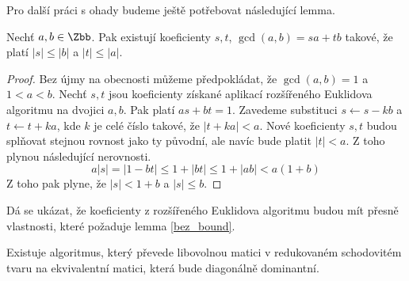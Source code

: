 Pro další práci s ohady budeme ještě potřebovat následující lemma.
\begin{lem} \label{bez_bound}
Nechť $ a, b \in \Zbb $. Pak existují koeficienty
$ s, t $, $ \gcd(a, b) = s a + t b $ takové, že platí $ |s| \leq |b| $ a
$ |t| \leq |a| $.
\end{lem}
\begin{proof}
Bez újmy na obecnosti můžeme předpokládat, že $ \gcd(a, b) = 1 $ a $ 1 < a < b $.
Nechť $ s, t $ jsou koeficienty získané aplikací rozšířeného Euklidova algoritmu
na dvojici $ a, b $. Pak platí $ a s + b t = 1 $. Zavedeme substituci
$ s \leftarrow s - k b $ a $ t \leftarrow t + k a $, kde $ k $ je celé číslo takové, že
$ |t + k a| < a $. Nové koeficienty $ s,t $ budou splňovat stejnou rovnost
jako ty původní, ale navíc bude platit $ |t| < a $. Z toho plynou následující
nerovnosti.
\begin{equation*}
    a |s| = | 1 - bt | \leq 1 + |bt| \leq 1 + |ab| < a(1 + b)
\end{equation*}
Z toho pak plyne, že $ |s| < 1 + b $ a $ |s| \leq b $.
\end{proof}
\begin{pozn}
Dá se ukázat, že koeficienty z rozšířeného Euklidova algoritmu budou mít přesně
vlastnosti, které požaduje lemma \ref{bez_bound}.
\end{pozn}



\begin{lem}
Existuje algoritmus, který převede libovolnou matici v redukovaném schodovitém
tvaru na ekvivalentní matici, která bude diagonálně dominantní.
\end{lem}



